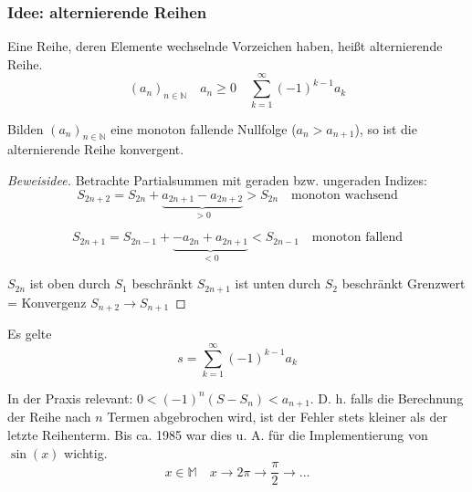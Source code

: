 \subsubsection{Idee: alternierende Reihen} %
\label{sub:idee_alternierende_reihen}

\begin{definition}
	Eine Reihe, deren Elemente wechselnde Vorzeichen haben, heißt alternierende Reihe.
	\[
		(a_n)_{n \in \mathbb{N} } \quad a_n \geq 0 \quad \sum_{k=1}^\infty (-1)^{k-1}a_k
	\]
\end{definition}

\begin{theorem}
	Bilden \( (a_n)_{n\in \mathbb{N}} \) eine monoton fallende Nullfolge (\( a_n>a_{n+1} \)), so ist die alternierende Reihe konvergent.
\end{theorem}

\begin{proof}[Beweisidee]
	Betrachte Partialsummen mit geraden bzw. ungeraden Indizes:
	\[
		S_{2n+2} = S_{2n} + \underbrace{a_{2n+1}-a_{2n+2}}_{>0} > S_{2n} \quad \text{monoton wachsend}
	\]
	
	\[
		S_{2n+1} = S_{2n-1} + \underbrace{-a_{2n}+a_{2n+1}}_{<0} < S_{2n-1} \quad \text{monoton fallend}
	\]
	
	\noindent \( S_{2n} \) ist oben durch \( S_1 \) beschränkt\newline
	\noindent \( S_{2n+1} \) ist unten durch \( S_2 \) beschränkt \newline\newline
	\noindent Grenzwert = Konvergenz \( S_{n+2}\rightarrow S_{n+1} \)
\end{proof}

\begin{note}

Es gelte \[ s=\sum_{k=1}^\infty (-1)^{k-1}a_k \] 

\noindent In der Praxis relevant: \( 0<(-1)^n(S-S_n) < a_{n+1} \). D. h. falls die Berechnung der Reihe nach \( n \) Termen abgebrochen wird, ist der Fehler stets kleiner als der letzte Reihenterm. Bis ca. 1985 war dies u. A. für die Implementierung von $\sin(x)$ wichtig.
\[
	x \in \mathbb{M} \quad x \rightarrow 2\pi \rightarrow \frac{\pi}{2} \rightarrow \ldots
\]
\end{note}

